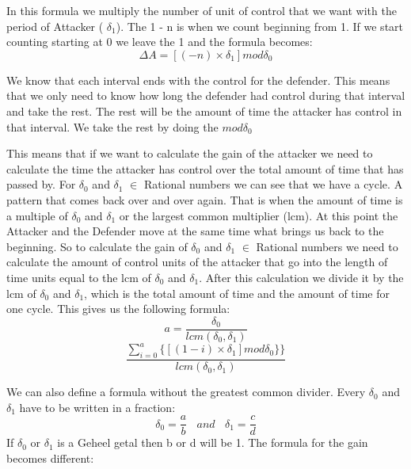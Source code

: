 In this formula we multiply the number of unit of control that we want with the period of Attacker ( $\delta_{1}$). The 1 - n is when we count beginning from 1. If we start counting starting at 0 we leave the 1 and the formula becomes:
\begin{equation}\label{first}
\Delta A = [( - n  ) \times \delta_{1}] mod \delta_{0}
\end{equation}

We know that each interval ends with the control for the defender. This means that we only need to know how long the defender had control during that interval and take the rest. The rest will be the amount of time the attacker has control in that interval. We take the rest by doing the $mod \delta_{0} $

This means that if we want to calculate the gain of the attacker we need to calculate the time the attacker has control over the total amount of time that has passed by.
For $\delta_{0}$ and $\delta_{1}$ $\in$ Rational numbers we can see that we have a cycle. A pattern that comes back over and over again. That is when the amount of time is a multiple of $\delta_{0}$ and $\delta_{1}$ or the largest common multiplier (lcm). At this point the Attacker and the Defender move at the same time what brings us back to the beginning.
So to calculate the gain of $\delta_{0}$ and $\delta_{1}$ $\in$ Rational numbers we need to calculate the amount of control units of the attacker that go into the length of time units equal to the lcm of  $\delta_{0}$ and $\delta_{1}$. After this calculation we divide it by the lcm of $\delta_{0} $ and $ \delta_{1}$, which is the total amount of time and the amount of time for one cycle.  This gives us the following formula:
\begin{equation}\label{first}
a = \dfrac{\delta_{0} }{lcm(\delta_{0},\delta_{1})} 
\end{equation}
\begin{equation}\label{first}
\dfrac{\sum_{i=0}^{a} \lbrace [( 1 - i ) \times \delta_{1}] mod \delta_{0} \rbrace \rbrace }{lcm(\delta_{0},\delta_{1})} 
\end{equation}

We can also define a formula without the greatest common divider. Every $\delta_{0}$ and $\delta_{1}$ have to be written in a fraction:
\begin{equation}\label{first}
\delta_{0}=\dfrac{a}{b} ~~~~and~~~~\delta_{1}=\dfrac{c}{d}
\end{equation}
If  $\delta_{0}$ or $\delta_{1}$ is a Geheel getal then b or d will be 1. The formula for the gain becomes different:\\


